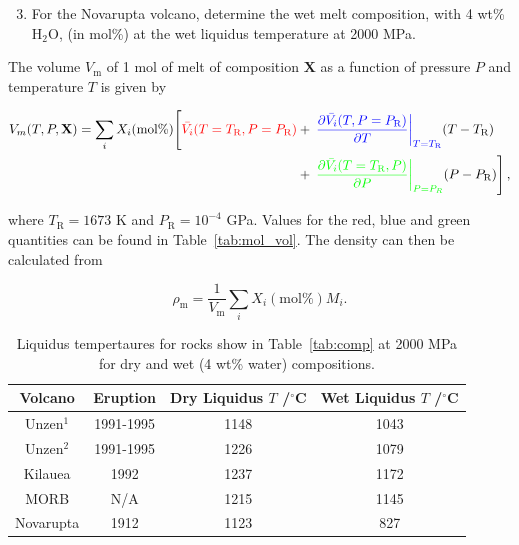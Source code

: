 \documentclass[]{book}
\theoremstyle{definition}
\begin{document}
\begin{enumerate}
  \begin{enumerate}\setcounter{enumii}{2}
  \item For the Novarupta volcano, determine the wet melt composition, with 4 wt\% H$_{2}$O, (in mol\%) at the wet liquidus temperature at 2000 MPa. 
\end{enumerate}

  The volume $V_{\text{m}}$ of 1 mol of melt of composition $\mathbf{X}$ as a function of pressure $P$ and temperature $T$ is given by

  \begin{align}
    \label{equ:mol_vol}
    V_{m}(T, P, \mathbf{X}) = \sum_{i} X_{i}(\text{mol\%}) \Bigg[ \textcolor{red}{\bar{V_{i}}(T = T_{\text{R}}, P = P_{\text{R}})} & + \left. \textcolor{blue}{\left. \frac{\partial \bar{V_{i}}(T, P = P_{\text{R}})}{\partial T}\right|_{T = T_{\text{R}}}} (T - T_{\text{R}}) \right. \nonumber \\
      & + \left. \textcolor{green}{\left.\frac{\partial \bar{V_{i}}(T = T_{\text{R}}, P)}{\partial P}\right|_{P = P_{R}}} (P - P_{\text{R}})\right], 
  \end{align}

  where $T_{\text{R}} = 1673$ K and $P_{\text{R}} = 10^{-4}$ GPa. Values for the red, blue and green quantities can be found in Table~\ref{tab:mol_vol}. The density can then be calculated from

  \begin{equation}
    \label{equ:dens}
    \rho_{\text{m}} = \frac{1}{V_{\text{m}}} \sum_{i} X_{i}(\text{mol\%}) M_{i}.
  \end{equation}
  
  \begin{table}
    \centering
    \caption{Liquidus tempertaures for rocks show in Table~\ref{tab:comp} at 2000 MPa for dry and wet (4 wt\% water) compositions. \label{tab:liq}}
    \begin{tabular}{|c|c|c|c|}
      \hline
      Volcano & Eruption & Dry Liquidus $T$ /$^{\circ}$C & Wet Liquidus $T$ /$^{\circ}$C  \\
      \hline
      Unzen$^{1}$ & 1991-1995 & 1148 & 1043 \\
      Unzen$^{2}$ & 1991-1995 & 1226 & 1079 \\
      Kilauea & 1992 & 1237 & 1172 \\
      MORB & N/A & 1215 & 1145 \\
      Novarupta & 1912 & 1123 & 827 \\
      \hline
    \end{tabular}
  \end{table}


\end{enumerate}
\end{document}
